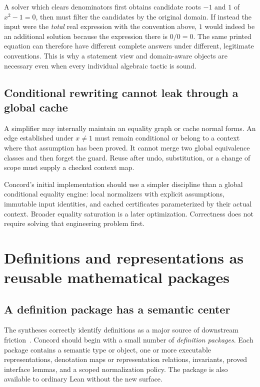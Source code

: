 \documentclass[11pt,a4paper]{article}
\theoremstyle{remark}
\begin{document}
A solver which clears denominators first obtains candidate roots $-1$ and $1$
of $x^2-1=0$, then must filter the candidates by the original domain. If instead
the input were the \emph{total} real expression with the convention above, $1$
would indeed be an additional solution because the expression there is $0/0=0$.
The same printed equation can therefore have different complete answers under
different, legitimate conventions. This is why a statement view and domain-aware
objects are necessary even when every individual algebraic tactic is sound.

\subsection{Conditional rewriting cannot leak through a global cache}
A simplifier may internally maintain an equality graph or cache normal forms.
An edge established under $x\ne1$ must remain conditional or belong to a context
where that assumption has been proved. It cannot merge two global equivalence
classes and then forget the guard. Reuse after undo, substitution, or a change of
scope must supply a checked context map.

Concord's initial implementation should use a simpler discipline than a global
conditional equality engine: local normalizers with explicit assumptions,
immutable input identities, and cached certificates parameterized by their
actual context. Broader equality saturation is a later optimization. Correctness
does not require solving that engineering problem first.

\section{Definitions and representations as reusable mathematical packages}
\label{sec:views}
\subsection{A definition package has a semantic center}
The syntheses correctly identify definitions as a major source of downstream
friction~\cite{synA,synB}. Concord should begin with a small number of
\emph{definition packages}. Each package contains a semantic type or object,
one or more executable representations, denotation maps or representation
relations, invariants, proved interface lemmas, and a scoped normalization policy.
The package is also available to ordinary Lean without the new surface.
\end{document}
